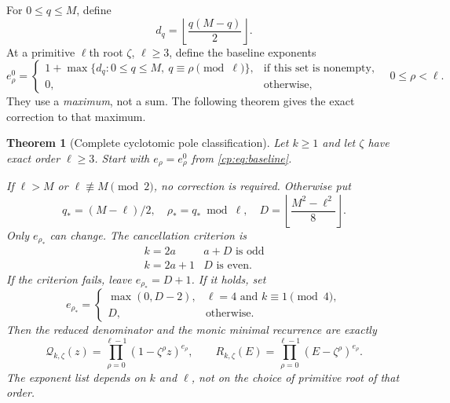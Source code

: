 \documentclass[11pt]{article}
\newtheorem{theorem}{Theorem}[section]
\theoremstyle{definition}
\theoremstyle{remark}
\newcommand{\QQ}{\mathscr Q}
\theoremstyle{definition}
\theoremstyle{plain}
\numberwithin{equation}{section}
\begin{document}
For $0\le q\le M$, define
\begin{equation}
 d_q=\left\lfloor\frac{q(M-q)}2\right\rfloor.
 \label{cp:eq:dq}
\end{equation}
At a primitive $\ell$th root $\zeta$, $\ell\ge3$, define the baseline exponents
\begin{equation}
 e^0_\rho=
 \begin{cases}
 1+\max\{d_q:0\le q\le M,\ q\equiv\rho\pmod\ell\},
      &\text{if this set is nonempty},\\
 0,&\text{otherwise},
 \end{cases}
 \quad 0\le\rho<\ell.
 \label{cp:eq:baseline}
\end{equation}
They use a \emph{maximum}, not a sum. The following theorem gives the exact
correction to that maximum.

\begin{theorem}[Complete cyclotomic pole classification]
\label{cp:thm:main}
Let $k\ge1$ and let $\zeta$ have exact order $\ell\ge3$.
Start with $e_\rho=e^0_\rho$ from \eqref{cp:eq:baseline}.

If $\ell>M$ or $\ell\not\equiv M\pmod2$, no correction is required.
Otherwise put
\begin{equation}
 q_*=(M-\ell)/2,\quad \rho_*=q_*\bmod\ell,\quad
 D=\left\lfloor\frac{M^2-\ell^2}{8}\right\rfloor.
 \label{cp:eq:tie}
\end{equation}
Only $e_{\rho_*}$ can change. The cancellation criterion is
\begin{equation}
 \begin{array}{c|c}
 k=2a & a+D\text{ is odd}\\
 k=2a+1 & D\text{ is even}.
 \end{array}
 \label{cp:eq:criterion}
\end{equation}
If the criterion fails, leave $e_{\rho_*}=D+1$. If it holds, set
\begin{equation}
 e_{\rho_*}=
 \begin{cases}
 \max(0,D-2),&\ell=4\text{ and }k\equiv1\pmod4,\\
 D,&\text{otherwise}.
 \end{cases}
 \label{cp:eq:correction}
\end{equation}
Then the reduced denominator and the monic minimal recurrence are exactly
\begin{equation}
 \boxed{\displaystyle
 \QQ_{k,\zeta}(z)=\prod_{\rho=0}^{\ell-1}(1-\zeta^\rho z)^{e_\rho},
 \qquad R_{k,\zeta}(E)=\prod_{\rho=0}^{\ell-1}(E-\zeta^\rho)^{e_\rho}.}
 \label{cp:eq:answer}
\end{equation}
The exponent list depends on $k$ and $\ell$, not on the choice of primitive
root of that order.
\end{theorem}
\end{document}
